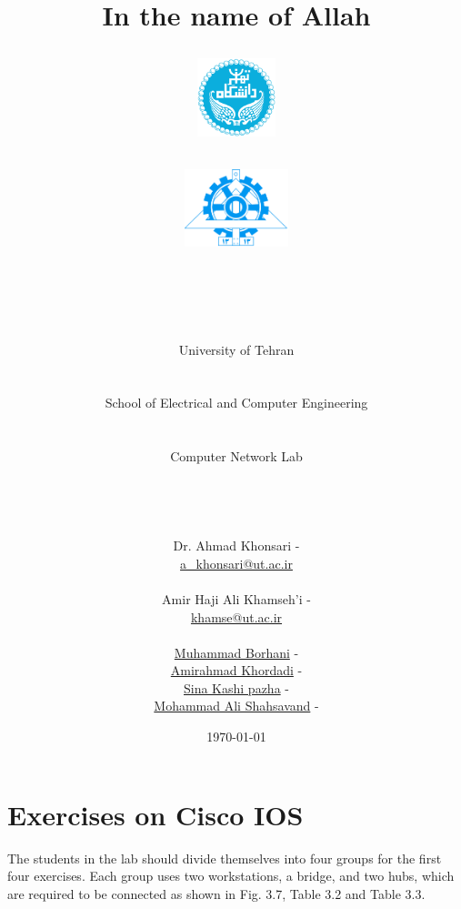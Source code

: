 \documentclass[10pt,a4paper]{article}
\title{
\normalsize In the name of Allah\\
\vspace{10pt}
\LARGE\FR{بسم \allah\  الرحمن الرحیم}
\vspace{10pt}
\begin{center}
    \begin{minipage}{0.48\textwidth}
        \begin{flushleft}
            \includegraphics[height=64pt,width=64pt]{../img/logo.png}
        \end{flushleft}
    \end{minipage}
    \begin{minipage}{0.48\textwidth}
        \begin{flushright}
            \includegraphics[height=64pt]{../img/eng-logo.png}
        \end{flushright}
    \end{minipage}
\end{center}
\vspace*{-64pt}
\huge \titleText\\
\vspace{40pt}
}
\author{
\huge University of Tehran\\
\LARGE \FR{دانشگاه تهران}\\
\\
\LARGE School of Electrical and Computer Engineering\\
\FR{دانشکده مهندسی برق و کامپیوتر}\\
\\
\Large Computer Network Lab\\
\FR{آزمایشگاه شبکه‌های کامپیوتری}\\
\\
\\
\\
\normalfont
Dr. Ahmad Khonsari - \FR{احمد خونساری}\\
\href{mailto:a_khonsari@ut.ac.ir}{a\_khonsari@ut.ac.ir}\\
\\
\normalsize
Amir Haji Ali Khamseh'i - \FR{امیر حاجی علی خمسه‌ء}\\
\href{mailto:khamse@ut.ac.ir}{khamse@ut.ac.ir}\\
\\
\normalsize \href{mailto:m.borhani@ut.ac.ir}{Muhammad Borhani} - \FR{محمد برهانی}\\
\normalsize \href{mailto:a.a.khordadi@ut.ac.ir}{Amirahmad Khordadi} - \FR{امیراحمد خردادی}\\
\normalsize \href{mailto:sina\_kashipazha@ut.ac.ir}{Sina Kashi pazha} - \FR{سینا کاشی پزها}\\
\normalsize \href{mailto:mashahsavand@ut.ac.ir}{Mohammad Ali Shahsavand} - \FR{محمد علی شاهسوند}
}
\date{\vspace{30pt}\today\\\vspace{10pt}{\selectlanguage{farsi}\today}}
\numberwithin{equation}{section}
\numberwithin{figure}{section}
\numberwithin{table}{section}
\begin{document}

    \maketitle


    \pagebreak





    \section*{Exercises on Cisco IOS}
    The students in the lab should divide themselves into four groups for the first four exercises. Each group uses two workstations, a bridge, and two hubs, which are required to be connected as shown in Fig. 3.7, Table 3.2 and Table 3.3.
\end{document}
